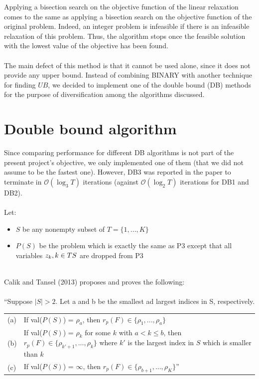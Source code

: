 \noindent Applying a bisection search on the objective function of the linear relaxation comes to the same as applying a bisection search
on the objective function of the original problem. Indeed, an integer problem is infeasible if there is an infeasible relaxation of this problem.
Thus, the algorithm stops once the feasible solution with the lowest value of the objective has been found. \\\\
The main defect of this method is that it cannot be used alone, since it does not provide any upper bound.
Instead of combining BINARY with another technique for finding $UB$, we decided to implement one of the
double bound (DB) methods for the purpose of diversification among the algorithms discussed.
\section{Double bound algorithm}
Since comparing performance for different DB algorithms is not part
of the present project's objective, we only implemented one of them (that we did not assume to be the fastest
one). However, DB3 was reported in the paper to terminate in $\mathcal{O}(\log_3 T)$ iterations (against $\mathcal{O}(\log_2 T)$ iterations for DB1 and DB2).\\\\
Let:
\begin{itemize}
	\item $S$ be any nonempty subset of $T = \lbrace 1, ..., K \rbrace$
	\item $P(S)$ be the problem which is exactly the same as P3 except that all variables $z_k, k \in T\\S$ are dropped from P3
\end{itemize}\ \\
Calik and Tansel (2013) proposes and proves the following:\\\\
``Suppose $|S| > 2$. Let a and b be the smallest ad largest indices in S, respectively.\\
\begin{tabularx}{\textwidth}{l X}
(a) & If val($P(S)$) = $\rho_a$, then $r_p(F) \in \lbrace \rho_1, ..., \rho_a \rbrace$\\
(b) & If val($P(S)$) = $\rho_k$ for some $k$ with $a < k \leq b$, then $r_p(F) \in \lbrace \rho_{k'+1}, ..., \rho_k \rbrace$ where $k'$ is the largest index in $S$ which is smaller than $k$ \\
(c) & If val($P(S)$) = $\infty$, then $r_p(F) \in \lbrace \rho_{b+1}, ..., \rho_K \rbrace$''\\
\end{tabularx}\ \\\\

